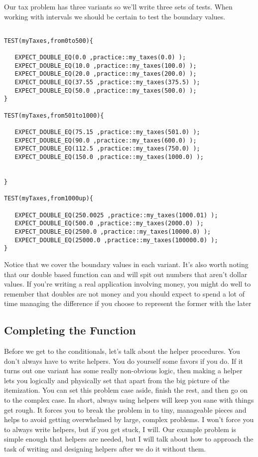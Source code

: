 \documentclass[]{tufte-handout}
\begin{document}
Our tax problem has three variants so we'll write three sets of tests. When working with intervals we should be certain to test the boundary values.
\begin{verbatim}

TEST(myTaxes,from0to500){
   
   EXPECT_DOUBLE_EQ(0.0 ,practice::my_taxes(0.0) );  
   EXPECT_DOUBLE_EQ(10.0 ,practice::my_taxes(100.0) );
   EXPECT_DOUBLE_EQ(20.0 ,practice::my_taxes(200.0) );
   EXPECT_DOUBLE_EQ(37.55 ,practice::my_taxes(375.5) );   
   EXPECT_DOUBLE_EQ(50.0 ,practice::my_taxes(500.0) );  
}

TEST(myTaxes,from501to1000){

   EXPECT_DOUBLE_EQ(75.15 ,practice::my_taxes(501.0) );  
   EXPECT_DOUBLE_EQ(90.0 ,practice::my_taxes(600.0) );
   EXPECT_DOUBLE_EQ(112.5 ,practice::my_taxes(750.0) );
   EXPECT_DOUBLE_EQ(150.0 ,practice::my_taxes(1000.0) );   

   
}

TEST(myTaxes,from1000up){

   EXPECT_DOUBLE_EQ(250.0025 ,practice::my_taxes(1000.01) );  
   EXPECT_DOUBLE_EQ(500.0 ,practice::my_taxes(2000.0) );
   EXPECT_DOUBLE_EQ(2500.0 ,practice::my_taxes(10000.0) );
   EXPECT_DOUBLE_EQ(25000.0 ,practice::my_taxes(100000.0) );      
}
\end{verbatim}

Notice that we cover the boundary values in each variant. It's also worth noting that our double based function can and will spit out numbers that aren't dollar values.  If you're writing a real application involving money, you might do well to remember that doubles are not money and you should expect to spend a lot of time managing the difference if you choose to represent the former with the later

\subsection{Completing the Function}

Before we get to the conditionals, let's talk about the helper procedures. You don't always have to write helpers. You do yourself some favors if you do. If it turns out one variant has some really non-obvious logic, then making a helper lets you logically and physically set that apart from the big picture of the itemization. You can set this problem case aside, finish the rest, and then go on to the complex case. In short, always using helpers will keep you sane with things get rough. It forces you to break the problem in to tiny, manageable pieces and helps to avoid getting overwhelmed by large, complex problems. I won't force you to always write helpers, but if you get stuck, I will. Our example problem is simple enough that helpers are needed, but I will talk about how to approach the task of writing and designing helpers after we do it without them.
\end{document}
